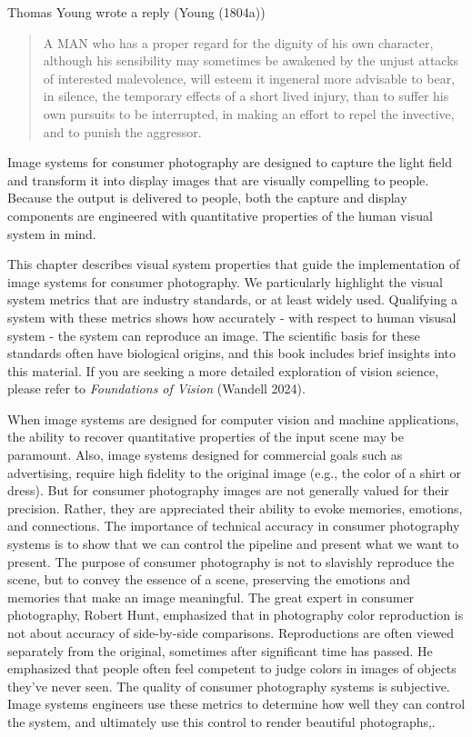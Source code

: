 \documentclass[
  letterpaper,
]{book}
\begin{document}
Thomas Young wrote a reply (Young (1804a))

\begin{quote}
A MAN who has a proper regard for the dignity of his own character,
although his sensibility may sometimes be awakened by the unjust attacks
of interested malevolence, will esteem it ingeneral more advisable to
bear, in silence, the temporary effects of a short lived injury, than to
suffer his own pursuits to be interrupted, in making an effort to repel
the invective, and to punish the aggressor.
\end{quote}

Image systems for consumer photography are designed to capture the light
field and transform it into display images that are visually compelling
to people. Because the output is delivered to people, both the capture
and display components are engineered with quantitative properties of
the human visual system in mind.

This chapter describes visual system properties that guide the
implementation of image systems for consumer photography. We
particularly highlight the visual system metrics that are industry
standards, or at least widely used. Qualifying a system with these
metrics shows how accurately - with respect to human visusal system -
the system can reproduce an image. The scientific basis for these
standards often have biological origins, and this book includes brief
insights into this material. If you are seeking a more detailed
exploration of vision science, please refer to \emph{Foundations of
Vision} (Wandell 2024).

When image systems are designed for computer vision and machine
applications, the ability to recover quantitative properties of the
input scene may be paramount. Also, image systems designed for
commercial goals such as advertising, require high fidelity to the
original image (e.g., the color of a shirt or dress). But for consumer
photography images are not generally valued for their precision. Rather,
they are appreciated their ability to evoke memories, emotions, and
connections. The importance of technical accuracy in consumer
photography systems is to show that we can control the pipeline and
present what we want to present. The purpose of consumer photography is
not to slavishly reproduce the scene, but to convey the essence of a
scene, preserving the emotions and memories that make an image
meaningful. The great expert in consumer photography, Robert Hunt,
emphasized that in photography color reproduction is not about accuracy
of side-by-side comparisons. Reproductions are often viewed separately
from the original, sometimes after significant time has passed. He
emphasized that people often feel competent to judge colors in images of
objects they've never seen. The quality of consumer photography systems
is subjective. Image systems engineers use these metrics to determine
how well they can control the system, and ultimately use this control to
render beautiful photographs,.
\end{document}
